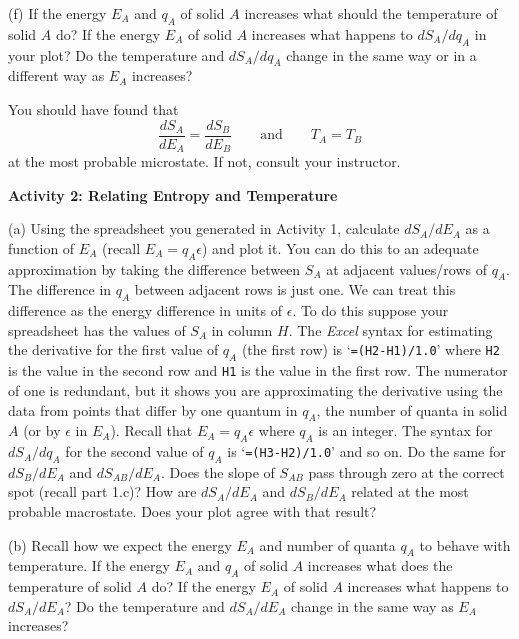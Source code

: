 (f) If the energy $E_A$ and $q_A$ of solid $A$ increases what should the temperature 
of solid $A$ do?
If the energy $E_A$ of solid $A$ increases what happens to $dS_A/dq_A$ in your plot?
Do the temperature and $dS_A/dq_A$ change in the same  way or in a different way 
as $E_A$ increases?
\vspace{15mm}


You should have found that 
\begin{equation}
\frac{dS_A}{dE_A} = \frac{dS_B}{dE_B} \qquad {\text {and}} \qquad T_A = T_B
\end{equation}
at the most probable microstate.
If not, consult your instructor.

\textbf{Activity 2: Relating Entropy and Temperature}

(a) Using the spreadsheet you generated in Activity 1, calculate $dS_A/dE_A$ as a function
of $E_A$ (recall $E_A = q_A \epsilon$) and plot it. You can do this to an adequate approximation
by  taking the difference between $S_A$ at adjacent values/rows
of $q_A$.
The difference in $q_A$ between adjacent rows is just one.
We can treat this difference as the energy difference in units of $\epsilon$.
To do this suppose your spreadsheet has the values of $S_A$ in column $H$.
The {\it Excel} syntax for estimating the derivative for the first value of
$q_A$ (the first row) is 
`{\tt =(H2-H1)/1.0}' where {\tt H2} is the value in the second row and {\tt H1} is the
value in the first row.
The numerator of one is redundant, but it shows you are approximating the derivative
using the data from points that differ by one quantum in $q_A$, the number of quanta in solid $A$ (or by $\epsilon$ in $E_A$).
Recall that $E_A = q_A\epsilon$ where $q_A$ is an integer.
The syntax for $dS_A/dq_A$ for the second value of $q_A$ is `{\tt =(H3-H2)/1.0}' and so on.
Do the same for $dS_B/dE_A$ and $dS_{AB}/dE_A$.
Does the slope of $S_{AB}$ pass through zero at the correct spot (recall part 1.c)?
How are $dS_A/dE_A$ and $dS_B/dE_A$ related at the most probable macrostate.
Does your plot agree with that result?
\vspace{15mm}

\newpage

(b) Recall how we expect the energy $E_A$ and number of quanta $q_A$ to behave with temperature.
If the energy $E_A$ and $q_A$ of solid $A$ increases what does the temperature 
of solid $A$ do?
If the energy $E_A$ of solid $A$ increases what happens to $dS_A/dE_A$?
Do the temperature and $dS_A/dE_A$ change in the same  way 
as $E_A$ increases?
\vspace{15mm}

